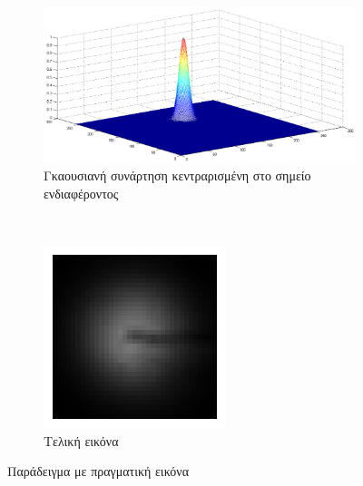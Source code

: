 \begin{figure}[!b]
        \centering
        \begin{subfigure}[t]{0.8\textwidth}
                \centerline{\includegraphics[scale = 0.25]{./images/examples/gaussianOfPointNo3.png}}
                \caption{Γκαουσιανή συνάρτηση κεντραρισμένη στο σημείο ενδιαφέροντος}
        \end{subfigure}%
        ~
        \centering
        \begin{subfigure}[t]{0.2\textwidth}
                \centerline{\includegraphics[scale = 0.2]{./images/examples/pointNo3cropped.png}}
                \caption{Τελική εικόνα}
        \end{subfigure}%
        \caption{Παράδειγμα με πραγματική εικόνα}
        \label{fig:lena}
\end{figure}
